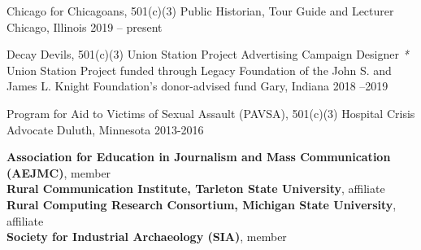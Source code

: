 \begin{cvhonors}
  \cvhonor
    {Chicago for Chicagoans, 501(c)(3) } 
    {Public Historian, Tour Guide and Lecturer } 
    {Chicago, Illinois} 
    {2019 -- present} 

  \cvhonor
    {Decay Devils, 501(c)(3) } %
    {Union Station Project Advertising Campaign Designer \scriptsize{\textit{*} Union Station Project funded through Legacy Foundation of the John S. and James L. Knight Foundation's donor-advised fund}} %
    {Gary, Indiana} %
    {2018 --2019} %
    
  \cvhonor
    {Program for Aid to Victims of Sexual Assault (PAVSA), 501(c)(3) } 
    {Hospital Crisis Advocate} 
    {Duluth, Minnesota} 
    {2013-2016} 
\end{cvhonors}

\begin{small} \color{black}

\textbf{Association for Education in Journalism and Mass Communication (AEJMC)}, member  \\
\textbf{Rural Communication Institute, Tarleton State University}, affiliate \\
\textbf{Rural Computing Research Consortium, Michigan State University}, affiliate \\
\textbf{Society for Industrial Archaeology (SIA)}, member \\
\end{small}





